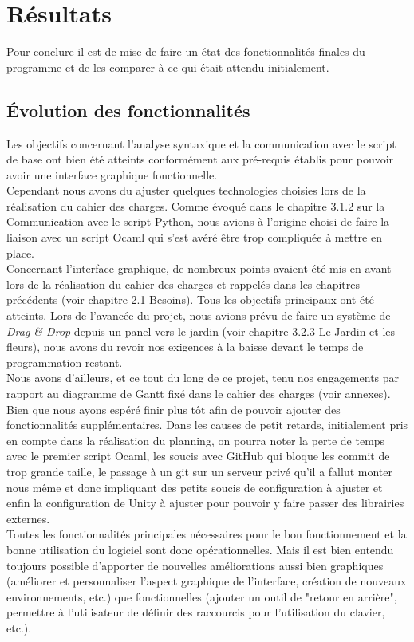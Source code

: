 \chapter{Résultats}

Pour conclure il est de mise de faire un état des fonctionnalités finales du programme et de les comparer à ce qui était attendu initialement.

\section{Évolution des fonctionnalités}

Les objectifs concernant l'analyse syntaxique et la communication avec le script de base ont bien été atteints conformément aux pré-requis établis pour pouvoir avoir une interface graphique fonctionnelle. \\
Cependant nous avons du ajuster quelques technologies choisies lors de la réalisation du cahier des charges. Comme évoqué dans le chapitre 3.1.2 sur la Communication avec le script Python, nous avions à l'origine choisi de faire la liaison avec un script Ocaml qui s'est avéré être trop compliquée à mettre en place.
\\
Concernant l'interface graphique, de nombreux points avaient été mis en avant lors de la réalisation du cahier des charges et rappelés dans les chapitres précédents (voir chapitre 2.1 Besoins). Tous les objectifs principaux ont été atteints. Lors de l'avancée du projet, nous avions prévu de faire un système de \textit{Drag \& Drop} depuis un panel vers le jardin (voir chapitre 3.2.3 Le Jardin et les fleurs), nous avons du revoir nos exigences à la baisse devant le temps de programmation restant.
\\
Nous avons d'ailleurs, et ce tout du long de ce projet, tenu nos engagements par rapport au diagramme de Gantt fixé dans le cahier des charges (voir annexes). Bien que nous ayons espéré finir plus tôt afin de pouvoir ajouter des fonctionnalités supplémentaires.
\newline Dans les causes de petit retards, initialement pris en compte dans la réalisation du planning, on pourra noter la perte de temps avec le premier script Ocaml, les soucis avec GitHub qui bloque les commit de trop grande taille, le passage à un git sur un serveur privé qu'il a fallut monter nous même et donc impliquant des petits soucis de configuration à ajuster et enfin la configuration de Unity à ajuster pour pouvoir y faire passer des librairies externes.
\\
Toutes les fonctionnalités principales nécessaires pour le bon fonctionnement et la bonne utilisation du logiciel sont donc opérationnelles. Mais il est bien entendu toujours possible d'apporter de nouvelles améliorations aussi bien graphiques (améliorer et personnaliser l'aspect graphique de l'interface, création de nouveaux environnements, etc.) que fonctionnelles (ajouter un outil de "retour en arrière", permettre à l'utilisateur de définir des raccourcis pour l'utilisation du clavier, etc.).

